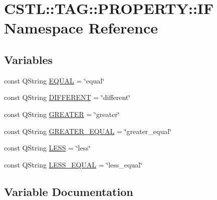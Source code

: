 \hypertarget{namespace_c_s_t_l_1_1_t_a_g_1_1_p_r_o_p_e_r_t_y_1_1_i_f}{}\section{C\+S\+TL\+:\+:T\+AG\+:\+:P\+R\+O\+P\+E\+R\+TY\+:\+:IF Namespace Reference}
\label{namespace_c_s_t_l_1_1_t_a_g_1_1_p_r_o_p_e_r_t_y_1_1_i_f}
\subsection*{Variables}
\begin{DoxyCompactItemize}
\item 
const Q\+String \hyperlink{namespace_c_s_t_l_1_1_t_a_g_1_1_p_r_o_p_e_r_t_y_1_1_i_f_a3fdf0e774425555b14dace8cbc5c0ef4}{E\+Q\+U\+AL} = \char`\"{}equal\char`\"{}
\item 
const Q\+String \hyperlink{namespace_c_s_t_l_1_1_t_a_g_1_1_p_r_o_p_e_r_t_y_1_1_i_f_a14f77f62f8853f8375761c6f67b2e82d}{D\+I\+F\+F\+E\+R\+E\+NT} = \char`\"{}different\char`\"{}
\item 
const Q\+String \hyperlink{namespace_c_s_t_l_1_1_t_a_g_1_1_p_r_o_p_e_r_t_y_1_1_i_f_a638dc3fdbdba4276ae856eb1eae9531a}{G\+R\+E\+A\+T\+ER} = \char`\"{}greater\char`\"{}
\item 
const Q\+String \hyperlink{namespace_c_s_t_l_1_1_t_a_g_1_1_p_r_o_p_e_r_t_y_1_1_i_f_a74a083288a33aafe279e0528b5b90a98}{G\+R\+E\+A\+T\+E\+R\+\_\+\+E\+Q\+U\+AL} = \char`\"{}greater\+\_\+equal\char`\"{}
\item 
const Q\+String \hyperlink{namespace_c_s_t_l_1_1_t_a_g_1_1_p_r_o_p_e_r_t_y_1_1_i_f_a74c8a014bba9021bddc2e95b74140d14}{L\+E\+SS} = \char`\"{}less\char`\"{}
\item 
const Q\+String \hyperlink{namespace_c_s_t_l_1_1_t_a_g_1_1_p_r_o_p_e_r_t_y_1_1_i_f_a5d08f3315503d45302261c809c51ca85}{L\+E\+S\+S\+\_\+\+E\+Q\+U\+AL} = \char`\"{}less\+\_\+equal\char`\"{}
\end{DoxyCompactItemize}


\subsection{Variable Documentation}
\mbox{\label{namespace_c_s_t_l_1_1_t_a_g_1_1_p_r_o_p_e_r_t_y_1_1_i_f_a14f77f62f8853f8375761c6f67b2e82d}} 
